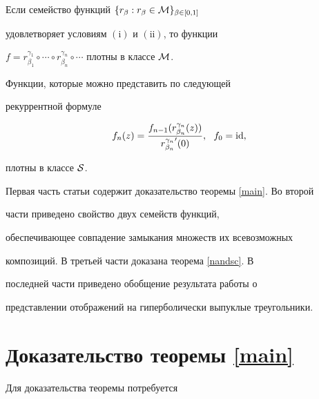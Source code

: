 \begin{thm} \label{main}


Если семейство функций $\{r_\beta:r_\beta\in{\cal M}\}_{\beta\in[0,1]}$


удовлетворяет условиям $(\mathrm i)$ и $(\mathrm{ii})$, то функции


$f=r_{\beta_1}^{\gamma_1}\circ\dotsb\circ


r_{\beta_n}^{\gamma_n}\circ\dotsb$ плотны в классе $\cal M$.


\end{thm}





\begin{cor}\label{s}


Функции, которые можно представить по следующей


рекуррентной формуле


$$


f_n(z)=\frac{f_{n-1}(r^{\gamma_n}_{\beta_n}(z))}


{{r_{\beta_n}^{\gamma_n}}'(0)},\ \ f_0=\id,


$$


плотны в классе $\cal S$.


\end{cor}





Первая часть статьи содержит доказательство теоремы \ref{main}. Во второй


части приведено свойство двух семейств функций,


обеспечивающее совпадение замыкания множеств их всевозможных


композиций. В третьей части доказана теорема \ref{nandsc}. В


последней части приведено обобщение результата работы \cite{PR} о


представлении отображений на гиперболически выпуклые треугольники.





\section{Доказательство теоремы \ref{main}}





Для доказательства теоремы потребуется





